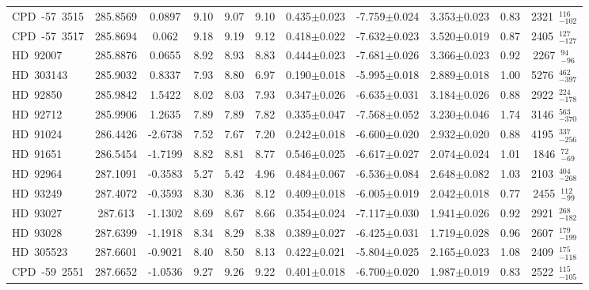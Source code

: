 {\begin{longtable}{lcccccccccc}
CPD~-57~3515 & 285.8569 & 0.0897 & 9.10 & 9.07 & 9.10 & 0.435$\pm$0.023 & -7.759$\pm$0.024 & 3.353$\pm$0.023 & 0.83 & 2321~$_{-102}^{116}$ \\
\noalign{\smallskip}
CPD~-57~3517 & 285.8694 & 0.062 & 9.18 & 9.19 & 9.12 & 0.418$\pm$0.022 & -7.632$\pm$0.023 & 3.520$\pm$0.019 & 0.87 & 2405~$_{-127}^{127}$ \\
\noalign{\smallskip}
HD~92007 & 285.8876 & 0.0655 & 8.92 & 8.93 & 8.83 & 0.444$\pm$0.023 & -7.681$\pm$0.026 & 3.366$\pm$0.023 & 0.92 & 2267~$_{-96}^{94}$ \\
\noalign{\smallskip}
HD~303143 & 285.9032 & 0.8337 & 7.93 & 8.80 & 6.97 & 0.190$\pm$0.018 & -5.995$\pm$0.018 & 2.889$\pm$0.018 & 1.00 & 5276~$_{-397}^{462}$ \\
\noalign{\smallskip}
HD~92850 & 285.9842 & 1.5422 & 8.02 & 8.03 & 7.93 & 0.347$\pm$0.026 & -6.635$\pm$0.031 & 3.184$\pm$0.026 & 0.88 & 2922~$_{-178}^{224}$ \\
\noalign{\smallskip}
HD~92712 & 285.9906 & 1.2635 & 7.89 & 7.89 & 7.82 & 0.335$\pm$0.047 & -7.568$\pm$0.052 & 3.230$\pm$0.046 & 1.74 & 3146~$_{-370}^{563}$ \\
\noalign{\smallskip}
HD~91024 & 286.4426 & -2.6738 & 7.52 & 7.67 & 7.20 & 0.242$\pm$0.018 & -6.600$\pm$0.020 & 2.932$\pm$0.020 & 0.88 & 4195~$_{-256}^{337}$ \\
\noalign{\smallskip}
HD~91651 & 286.5454 & -1.7199 & 8.82 & 8.81 & 8.77 & 0.546$\pm$0.025 & -6.617$\pm$0.027 & 2.074$\pm$0.024 & 1.01 & 1846~$_{-69}^{72}$ \\
\noalign{\smallskip}
HD~92964 & 287.1091 & -0.3583 & 5.27 & 5.42 & 4.96 & 0.484$\pm$0.067 & -6.536$\pm$0.084 & 2.648$\pm$0.082 & 1.03 & 2103~$_{-268}^{404}$ \\
\noalign{\smallskip}
HD~93249 & 287.4072 & -0.3593 & 8.30 & 8.36 & 8.12 & 0.409$\pm$0.018 & -6.005$\pm$0.019 & 2.042$\pm$0.018 & 0.77 & 2455~$_{-99}^{112}$ \\
\noalign{\smallskip}
HD~93027 & 287.613 & -1.1302 & 8.69 & 8.67 & 8.66 & 0.354$\pm$0.024 & -7.117$\pm$0.030 & 1.941$\pm$0.026 & 0.92 & 2921~$_{-182}^{268}$ \\
\noalign{\smallskip}
HD~93028 & 287.6399 & -1.1918 & 8.34 & 8.29 & 8.38 & 0.389$\pm$0.027 & -6.425$\pm$0.031 & 1.719$\pm$0.028 & 0.96 & 2607~$_{-199}^{179}$ \\
\noalign{\smallskip}
HD~305523 & 287.6601 & -0.9021 & 8.40 & 8.50 & 8.13 & 0.422$\pm$0.021 & -5.804$\pm$0.025 & 2.165$\pm$0.023 & 1.08 & 2409~$_{-118}^{175}$ \\
\noalign{\smallskip}
CPD~-59~2551 & 287.6652 & -1.0536 & 9.27 & 9.26 & 9.22 & 0.401$\pm$0.018 & -6.700$\pm$0.020 & 1.987$\pm$0.019 & 0.83 & 2522~$_{-105}^{115}$ \\

\end{longtable}}
